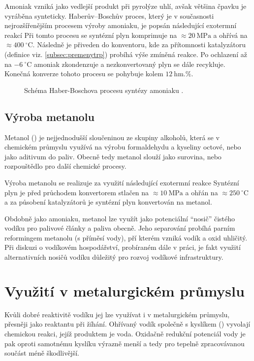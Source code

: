 Amoniak vzniká jako vedlejší produkt při pyrolýze uhlí, avšak většina čpavku je vyráběna synteticky. \cite{Chehade2021} Haberův–Boschův proces, který je v současnosti nejrozšířenějším procesem výroby amoniaku, je popsán následující exotermní reakcí
Při tomto procesu se syntézní plyn komprimuje na $\approx20\ \mathrm{MPa}$ a ohřívá na $\approx400\ \mathrm{^{\circ}C}$. Následně je přiveden do konventoru, kde za přítomnosti katalyzátoru (definice viz. \ref{subsec:premenytrp}) probíhá výše zmíněná reakce. Po ochlazení až na $-6\ \mathrm{^{\circ}C}$ amoniak zkondenzuje a nezkonvertovaný plyn se dále recykluje. Konečná konverze tohoto procesu se pohybuje kolem $12\ \mathrm{hm.}\%$. \cite{Seddon2022}
\begin{figure}[h]
    \centering
    
    \caption[Schéma Haber-Boschova procesu syntézy amoniaku]{Schéma Haber-Boschova procesu syntézy amoniaku \cite{Seddon2022}.} \label{fig:amoniak}
\end{figure} 

\subsection{Výroba metanolu}
Metanol () je nejjednodušší sloučeninou ze skupiny alkoholů, která se v chemickém průmyslu využívá na výrobu formaldehydu a kyseliny octové, nebo jako aditivum do paliv. Obecně tedy metanol slouží jako surovina, nebo rozpouštědlo pro další chemické procesy. \cite{Seddon2022,Basile2017}

Výroba metanolu se realizuje za využití následující exotermní reakce \cite{Seddon2022}
Syntézní plyn je před průchodem konvertorem stlačen na $\approx10\ \mathrm{MPa}$ a ohřán na $\approx250\ \mathrm{^{\circ}C}$ a za působení katalyzátorů je syntézní plyn konvertován na metanol. \cite{Seddon2022}

Obdobně jako amoniaku, metanol lze využít jako potenciální \enquote{nosič} čistého vodíku pro palivové články a paliva obecně. Jeho separování probíhá parním reformingem metanolu (s příměsí vody), pří kterém vzniká vodík a oxid uhličitý. \cite{Seddon2022} Při diskuzi o vodíkovém hospodářství, probíraném dále v práci, je fakt využití alternativních nosičů vodíku důležitý pro rozvoj vodíkové infrastruktury.

\section{Využití v metalurgickém průmyslu}
Kvůli dobré reaktivitě vodíku jej lze využívat i v metalurgickém průmyslu, přesněji jako reaktantu při žíhání. Ohřívaný vodík společně s kyslíkem () vyvolají chemickou reakci, jejíž produktem je voda. Oxidačně redukční potenciál vody je pak oproti samotnému kyslíku výrazně menší a tedy pro tepelně zpracovávanou součást méně škodlivější. \cite{Ramachandran1998}

